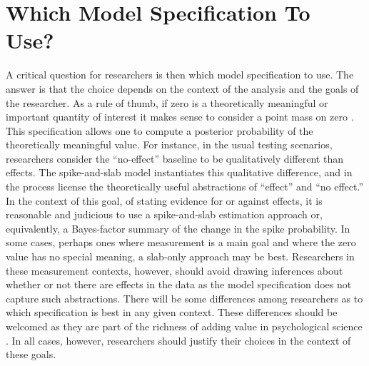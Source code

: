 \section{Which Model Specification To Use?}
A critical question for researchers is then which model specification to use.  The answer is that the choice depends on the context of the analysis and the goals of the researcher. As a rule of thumb, if zero is a theoretically meaningful or important quantity of interest it makes sense to consider a point mass on zero .  This specification allows one to compute a posterior probability of the theoretically meaningful value.  For instance, in the usual testing scenarios, researchers consider the ``no-effect'' baseline to be qualitatively different than effects.  The spike-and-slab model instantiates this qualitative difference, and in the process license the theoretically useful abstractions of ``effect'' and ``no effect.''  In the context of this goal, of stating evidence for or against effects, it is reasonable and judicious to use a spike-and-slab estimation approach or, equivalently, a Bayes-factor summary of the change in the spike probability.  In some cases, perhaps ones where measurement is a main goal and where the zero value has no special meaning, a slab-only approach may be best.  Researchers in these measurement contexts, however, should avoid drawing inferences about whether or not there are effects in the data as the model specification does not capture such abstractions.  There will be some differences among researchers as to which specification is best in any given context.  These differences should be welcomed as they are part of the richness of adding value in psychological science \cite{Rouder:etal:2016b}.  In all cases, however, researchers should justify their choices in the context of these goals.  

